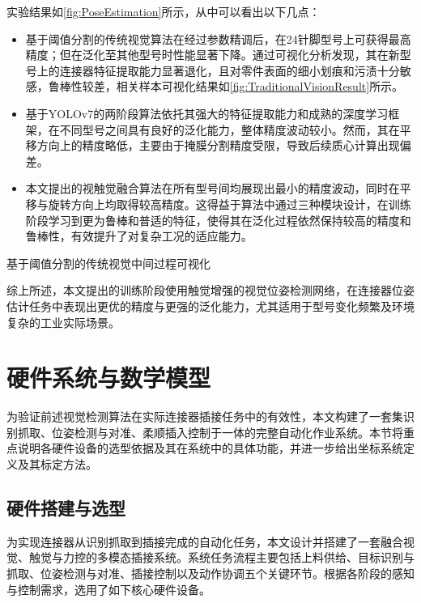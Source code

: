 \documentclass{Diploma}
\begin{document}
实验结果如\ref{fig:PoseEstimation}所示，从中可以看出以下几点：


\begin{itemize}
  \item 基于阈值分割的传统视觉算法在经过参数精调后，在24针脚型号上可获得最高精度；但在泛化至其他型号时性能显著下降。通过可视化分析发现，其在新型号上的连接器特征提取能力显著退化，且对零件表面的细小划痕和污渍十分敏感，鲁棒性较差，相关样本可视化结果如\ref{fig:TraditionalVisionResult}所示。
  
  \item 基于YOLOv7的两阶段算法依托其强大的特征提取能力和成熟的深度学习框架，在不同型号之间具有良好的泛化能力，整体精度波动较小。然而，其在平移方向上的精度略低，主要由于掩膜分割精度受限，导致后续质心计算出现偏差。
  
  \item 本文提出的视触觉融合算法在所有型号间均展现出最小的精度波动，同时在平移与旋转方向上均取得较高精度。这得益于算法中通过三种模块设计，在训练阶段学习到更为鲁棒和普适的特征，使得其在泛化过程依然保持较高的精度和鲁棒性，有效提升了对复杂工况的适应能力。
\end{itemize}
 
\begin{subfigures}[TraditionalVisionResult]{基于阈值分割的传统视觉中间过程可视化}
\end{subfigures}

综上所述，本文提出的训练阶段使用触觉增强的视觉位姿检测网络，在连接器位姿估计任务中表现出更优的精度与更强的泛化能力，尤其适用于型号变化频繁及环境复杂的工业实际场景。
\section{硬件系统与数学模型}
为验证前述视觉检测算法在实际连接器插接任务中的有效性，本文构建了一套集识别抓取、位姿检测与对准、柔顺插入控制于一体的完整自动化作业系统。本节将重点说明各硬件设备的选型依据及其在系统中的具体功能，并进一步给出坐标系统定义及其标定方法。
\subsection{硬件搭建与选型}
为实现连接器从识别抓取到插接完成的自动化任务，本文设计并搭建了一套融合视觉、触觉与力控的多模态插接系统。系统任务流程主要包括上料供给、目标识别与抓取、位姿检测与对准、插接控制以及动作协调五个关键环节。根据各阶段的感知与控制需求，选用了如下核心硬件设备。
\end{document}
